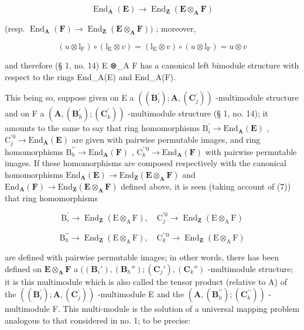 \[
\operatorname{End} _ {\mathbf {A}} (\mathbf {E}) \rightarrow \operatorname{End} _ {\mathbf {Z}} (\mathbf {E} \otimes_ {\mathbf {A}} \mathbf {F})
\]

(resp. \(\operatorname{End}_{\mathbf{A}}(\mathbf{F}) \to \operatorname{End}_{\mathbf{Z}}(\mathbf{E} \otimes_{\mathbf{A}} \mathbf{F}))\) ; moreover,

\[
(u \otimes \mathrm{l} _ {\mathrm{F}}) \circ (\mathrm{l} _ {\mathrm{E}} \otimes v) = (\mathrm{l} _ {\mathrm{E}} \otimes v) \circ (u \otimes \mathrm{l} _ {\mathrm{F}}) = u \otimes v\tag{7}
\]

and therefore (§ 1, no. 14) E ⊗\_A F has a canonical left bimodule structure with respect to the rings End\_A(E) and End\_A(F).

This being so, suppose given on E a \(((\mathbf{B}_i^{\prime});\mathbf{A},(\mathbf{C}_j^{\prime}))\) -multimodule structure and on F a \((\mathbf{A},(\mathbf{B}_h^{\prime});(\mathbf{C}_k^{\prime}))\) -multimodule structure (§ 1, no. 14); it amounts to the same to say that ring homomorphisms \(\mathrm{B}_i^\prime \to \mathrm{End}_{\mathbf{A}}(\mathbf{E})\) , \(\mathrm{C}_j^{\prime 0} \to \mathrm{End}_{\mathbf{A}}(\mathbf{E})\) are given with pairwise permutable images, and ring homomorphisms \(\mathrm{B}_h^{\prime \prime} \to \mathrm{End}_{\mathbf{A}}(\mathbf{F})\) , \(\mathrm{C}_k^{\prime \prime 0} \to \mathrm{End}_{\mathbf{A}}(\mathbf{F})\) with pairwise permutable images. If these homomorphisms are composed respectively with the canonical homomorphisms \(\mathrm{End}_{\mathbf{A}}(\mathbf{E}) \to \mathrm{End}_{\mathbf{Z}}(\mathbf{E} \otimes_{\mathbf{A}} \mathbf{F})\) and \(\mathrm{End}_{\mathbf{A}}(\mathbf{F}) \to \mathrm{End}_{\mathbf{Z}}(\mathbf{E} \otimes_{\mathbf{A}} \mathbf{F})\) defined above, it is seen (taking account of (7)) that ring homomorphisms

\[
\mathrm{B} _ {i} ^ {\prime} \rightarrow \operatorname{End} _ {\mathbf {Z}} (\mathrm{E} \otimes_ {\mathrm{A}} \mathrm{F}), \quad \mathrm{C} _ {j} ^ {\prime 0} \rightarrow \operatorname{End} _ {\mathbf {Z}} (\mathrm{E} \otimes_ {\mathrm{A}} \mathrm{F})
\]

\[
\mathrm{B} _ {h} ^ {\prime \prime} \rightarrow \operatorname{End} _ {\mathbf {Z}} (\mathrm{E} \otimes_ {\mathrm{A}} \mathrm{F}), \quad \mathrm{C} _ {k} ^ {\prime \prime 0} \rightarrow \operatorname{End} _ {\mathbf {Z}} (\mathrm{E} \otimes_ {\mathrm{A}} \mathrm{F})
\]

are defined with pairwise permutable images; in other words, there has been defined on \(\mathbf{E} \otimes_{\mathbf{A}} \mathbf{F}\) a \(((\mathbf{B}_i'), (\mathbf{B}_h''); (\mathbf{C}_j'), (\mathbf{C}_k'')\) -multimodule structure; it is this multimodule which is also called the tensor product (relative to A) of the \(((\mathbf{B}_i^{\prime});\mathbf{A},(\mathbf{C}_j^{\prime}))\) -multimodule E and the \((\mathbf{A},(\mathbf{B}_h^{\prime\prime});(\mathbf{C}_k^{\prime\prime}))\) -multimodule F. This multi-module is the solution of a universal mapping problem analogous to that considered in no. 1; to be precise:

